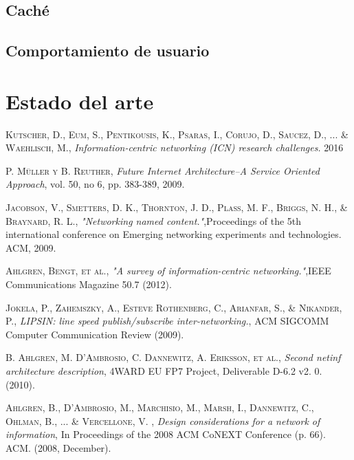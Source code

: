 \documentclass[12pt]{ociamthesis}  %
\begin{document}
\section{Caché}


\section{Comportamiento de usuario}


\chapter{Estado del arte}



\begin{thebibliography}{a}
	 \textsc{Kutscher, D., Eum, S., Pentikousis, K., Psaras, I., Corujo, D., Saucez, D., ... \& Waehlisch, M.},
	\textit{Information-centric networking (ICN) research challenges.} 2016
	
	 \textsc{P. Müller y B. Reuther},
	\textit{Future Internet Architecture–A Service Oriented Approach}, vol. 50, no 6, pp. 383-389, 2009.
	
	 \textsc{Jacobson, V., Smetters, D. K., Thornton, J. D., Plass, M. F., Briggs, N. H., \& Braynard, R. L.},
	\textit{"Networking named content."},Proceedings of the 5th international conference on Emerging networking experiments and technologies. ACM, 2009.
	
	 \textsc{Ahlgren, Bengt, et al.},
	\textit{"A survey of information-centric networking."},IEEE Communications Magazine 50.7 (2012).
	
	 \textsc{Jokela, P., Zahemszky, A., Esteve Rothenberg, C., Arianfar, S., \& Nikander, P.},
	\textit{LIPSIN: line speed publish/subscribe inter-networking.}, ACM SIGCOMM Computer Communication Review (2009).
	
	 \textsc{B. Ahlgren, M. D'Ambrosio, C. Dannewitz, A. Eriksson, et al.},
	\textit{Second netinf architecture description}, 4WARD EU FP7 Project, Deliverable D-6.2 v2. 0. (2010).
	
	 \textsc{Ahlgren, B., D'Ambrosio, M., Marchisio, M., Marsh, I., Dannewitz, C., Ohlman, B., ... \& Vercellone, V. },
	\textit{Design considerations for a network of information}, In Proceedings of the 2008 ACM CoNEXT Conference (p. 66). ACM. (2008, December).
	

\end{thebibliography}
\end{document}
